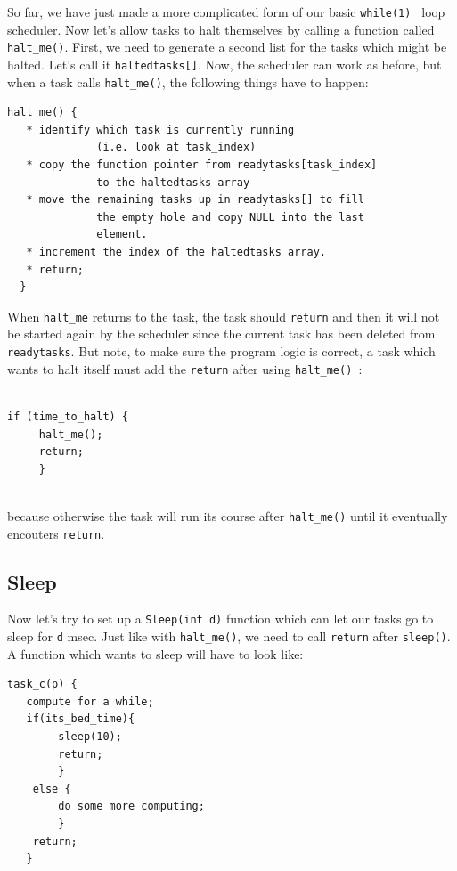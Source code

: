 \documentclass{article}	%
\begin{document}
So far, we have just made a more complicated form of our basic {\tt while(1) } loop scheduler.  Now let's allow tasks to halt themselves by calling a function called
{\tt halt\_me()}.   
First, we need to generate a second list for the tasks which might be halted.     Let's call it {\tt haltedtasks[]}.   Now, the scheduler can work as before, but when 
a task calls {\tt halt\_me()}, the following things have to happen:

\begin{verbatim}
halt_me() {
   * identify which task is currently running 
              (i.e. look at task_index)
   * copy the function pointer from readytasks[task_index] 
              to the haltedtasks array
   * move the remaining tasks up in readytasks[] to fill 
              the empty hole and copy NULL into the last 
              element.
   * increment the index of the haltedtasks array.
   * return;
  }
\end{verbatim}


When {\tt halt\_me} returns to the task, the task should {\tt return} and then it will not be started again by the scheduler since the current task has been deleted from 
{\tt readytasks}.  But note, to make sure the program logic is correct, a task which wants to
halt itself must add the {\tt return} after using {\tt halt\_me() }:

\begin{verbatim}

if (time_to_halt) {
     halt_me();
     return;
     }
     
\end{verbatim}

because otherwise the task will run its course after {\tt halt\_me()} until it eventually encouters {\tt return}.


\subsection*{Sleep}

  Now let's try to set up a {\tt Sleep(int d)} function which can let our tasks
go to sleep for {\tt d} msec.   Just like with {\tt halt\_me()},
we need to call {\tt return} after {\tt sleep()}. 
A function which wants to sleep will have to
look like:

\begin{verbatim}
task_c(p) {
   compute for a while;
   if(its_bed_time){
        sleep(10);
        return;
        }
    else {
        do some more computing;
        }
    return;
   }
\end{verbatim}
\end{document}
